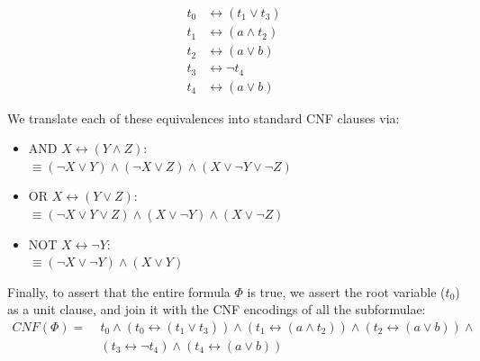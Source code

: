 \documentclass[a4paper, 11pt]{report}
\begin{document}
\noindent
\begin{minipage}{0.45\textwidth}
\begin{align*}
t_0 &\leftrightarrow (t_1 \lor t_3) \\
t_1 &\leftrightarrow (a \land t_2) \\
t_2 &\leftrightarrow (a \lor b) \\
t_3 &\leftrightarrow \neg t_4 \\
t_4 &\leftrightarrow (a \lor b) 
\end{align*}
\end{minipage}%
\hfill
\begin{minipage}{0.5\textwidth}
\centering
{}
\end{minipage}

\vspace{0.5em}
We translate each of these equivalences into standard CNF clauses via:
\begin{itemize}
    \item AND $X \leftrightarrow (Y \land Z)$: \\
    $\equiv (\neg X \lor Y) \land (\neg X \lor Z) \land (X \lor \neg Y \lor \neg Z)$
    
    \item OR $X \leftrightarrow (Y \lor Z)$: \\
    $\equiv (\neg X \lor Y \lor Z) \land (X \lor \neg Y) \land (X \lor \neg Z)$
    
    \item NOT $X \leftrightarrow \neg Y$: \\
    $\equiv (\neg X \lor \neg Y) \land (X \lor Y)$
\end{itemize}

Finally, to assert that the entire formula $\Phi$ is true, we assert the root variable ($t_0$) as a unit clause, and join it with the CNF encodings of all the subformulae:
\begin{align*}
CNF(\Phi) =\; & t_0 \land (t_0 \leftrightarrow (t_1 \lor t_3)) \land (t_1 \leftrightarrow (a \land t_2)) \land (t_2 \leftrightarrow (a \lor b)) \land \\
& (t_3 \leftrightarrow \neg t_4) \land (t_4 \leftrightarrow (a \lor b))
\end{align*}
\end{document}
